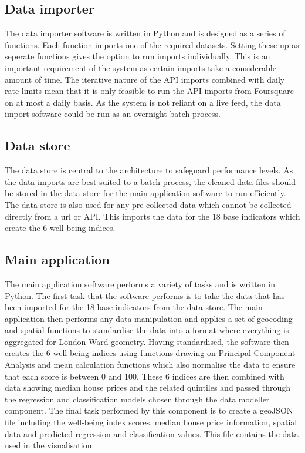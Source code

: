 
\subsection{Data importer}
The data importer software is written in Python and is designed as a series of functions. Each function imports one of the required datasets. Setting these up as seperate functions gives the option to run imports individually. This is an important requirement of the system as certain imports take a considerable amount of time. The iterative nature of the API imports combined with daily rate limits mean that it is only feasible to run the API imports from Foursquare on at most a daily basis. As the system is not reliant on a live feed, the data import software could be run as an overnight batch process. 


\subsection{Data store}
The data store is central to the architecture to safeguard performance levels. As the data imports are best suited to a batch process, the cleaned data files should be stored in the data store for the main application software to run efficiently. The data store is also used for any pre-collected data which cannot be collected directly from a url or API. This imports the data for the 18 base indicators which create the 6 well-being indices.


\subsection{Main application}
The main application software performs a variety of tasks and is written in Python. The first task that the software performs is to take the data that has been imported for the 18 base indicators from the data store. The main application then performs any data manipulation and applies a set of geocoding and spatial functions to standardise the data into a format where everything is aggregated for London Ward geometry. Having standardised, the software then creates the 6 well-being indices using functions drawing on Principal Component Analysis and mean calculation functions which also normalise the data to ensure that each score is between 0 and 100.
These 6 indices are then combined with data showing median house prices and the related quintiles and passed through the regression and classification models chosen through the data modeller component. The final task performed by this component is to create a geoJSON file including the well-being index scores, median house price information, spatial data and predicted regression and classification values. This file contains the data used in the visualisation.


